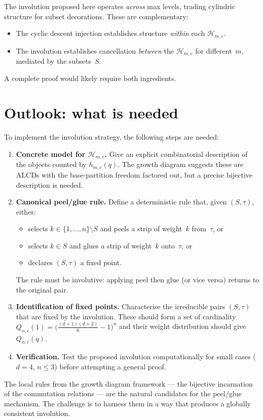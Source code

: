 \documentclass[11pt]{article}
\theoremstyle{plain}
\theoremstyle{definition}
\begin{document}
The involution proposed here operates \emph{across} max levels,
trading cylindric structure for subset decorations.  These are
complementary:
\begin{itemize}
  \item The cyclic descent injection establishes structure
    \emph{within} each $\mathcal{H}_{m,c}$.
  \item The involution establishes cancellation \emph{between}
    the $\mathcal{H}_{m,c}$ for different~$m$, mediated by the
    subsets~$S$.
\end{itemize}

A complete proof would likely require both ingredients.


\section{Outlook: what is needed}
\label{sec:outlook}

To implement the involution strategy, the following steps are needed:

\begin{enumerate}
  \item \textbf{Concrete model for $\mathcal{H}_{m,c}$.}
    Give an explicit combinatorial description of the objects
    counted by $h_{m,c}(q)$.  The growth diagram suggests these
    are ALCDs with the base-partition freedom factored out,
    but a precise bijective description is needed.

  \item \textbf{Canonical peel/glue rule.}
    Define a deterministic rule that, given $(S, \tau)$, either:
    \begin{itemize}
      \item selects $k \in \{1, \ldots, n\} \setminus S$ and peels
        a strip of weight~$k$ from~$\tau$, or
      \item selects $k \in S$ and glues a strip of weight~$k$
        onto~$\tau$, or
      \item declares $(S, \tau)$ a fixed point.
    \end{itemize}
    The rule must be involutive: applying peel then glue (or vice
    versa) returns to the original pair.

  \item \textbf{Identification of fixed points.}
    Characterise the irreducible pairs $(S, \tau)$ that are fixed
    by the involution.  These should form a set of cardinality
    $Q_{n,c}(1) = \bigl(\frac{(d+1)(d+2)}{6} - 1\bigr)^n$
    and their weight distribution should give~$Q_{n,c}(q)$.

  \item \textbf{Verification.}
    Test the proposed involution computationally for small cases
    ($d = 4$, $n \leq 3$) before attempting a general proof.
\end{enumerate}

The local rules from the growth diagram framework --- the bijective
incarnation of the commutation relations --- are the natural
candidates for the peel/glue mechanism.  The challenge is to
harness them in a way that produces a globally consistent involution.
\end{document}
